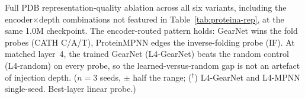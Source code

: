 \begin{table}[tbp]
\centering
\small
\setlength{\tabcolsep}{5pt}

\caption{Full PDB representation-quality ablation across all six variants, including the encoder$\times$depth combinations not featured in Table~\ref{tab:proteina-rep}, at the same 1.0M checkpoint. The encoder-routed pattern holds: GearNet wins the fold probes (CATH C/A/T), ProteinMPNN edges the inverse-folding probe (IF). At matched layer~4, the trained GearNet (L4-GearNet) beats the random control (L4-random) on every probe, so the learned-versus-random gap is not an artefact of injection depth. ($n{=}3$ seeds, $\pm$ half the range; ($^{\dagger}$) L4-GearNet and L4-MPNN single-seed. Best-layer linear probe.)}
\label{tab:proteina-rep-full}
\end{table}
